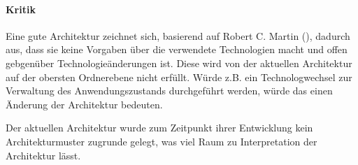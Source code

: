 
\paragraph{Kritik}
Eine gute Architektur zeichnet sich, basierend auf Robert C. Martin (\citeyear[S. 196 - 197]{Martin2018}), dadurch aus, dass sie keine Vorgaben über die verwendete Technologien macht und offen gebgenüber Technologieänderungen ist. 
Diese wird von der aktuellen Architektur auf der obersten Ordnerebene nicht erfüllt. Würde z.B. ein Technologwechsel zur Verwaltung des Anwendungszustands durchgeführt werden, würde das einen Änderung der Architektur bedeuten.

Der aktuellen Architektur wurde zum Zeitpunkt ihrer Entwicklung kein Architekturmuster zugrunde gelegt, was viel Raum zu Interpretation der Architektur lässt. 



